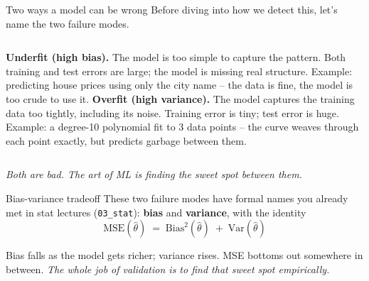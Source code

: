\documentclass[aspectratio=169]{beamer}
\begin{document}
\begin{frame}{Two ways a model can be wrong}
  Before diving into how we detect this, let's name the two failure modes.
  \vfill
  \begin{columns}[T]
    \textbf{Underfit (high bias).}
    The model is too simple to capture the pattern. Both training and test errors are large; the model is missing real structure.
    \vskip 6pt
    Example: predicting house prices using only the city name -- the data is fine, the model is too crude to use it.
    \textbf{Overfit (high variance).}
    The model captures the training data too tightly, including its noise. Training error is tiny; test error is huge.
    \vskip 6pt
    Example: a degree-10 polynomial fit to 3 data points -- the curve weaves through each point exactly, but predicts garbage between them.
  \end{columns}
  \vfill
  \emph{Both are bad. The art of ML is finding the sweet spot between them.}
\end{frame}

\begin{frame}{Bias-variance tradeoff}
  These two failure modes have formal names you already met in stat lectures (\texttt{03\_stat}): \textbf{bias} and \textbf{variance}, with the identity
  \[
    \mathrm{MSE}(\hat\theta) \;=\; \mathrm{Bias}^2(\hat\theta) \;+\; \mathrm{Var}(\hat\theta)
  \]
  \vfill
  \begin{center}
  \end{center}
  \vfill
  \footnotesize Bias falls as the model gets richer; variance rises. MSE bottoms out somewhere in between. \emph{The whole job of validation is to find that sweet spot empirically.}
\end{frame}
\end{document}
